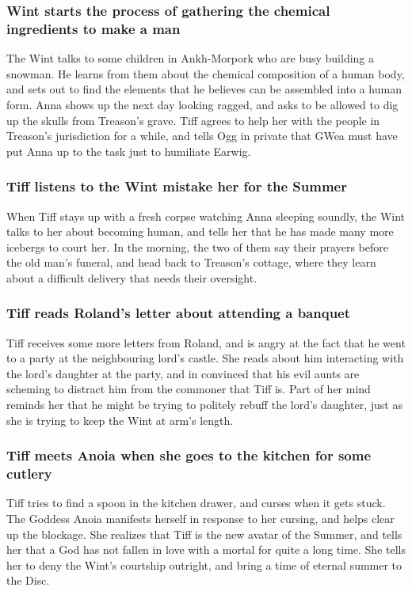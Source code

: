 \subsubsection{\Gls{Wint} starts the process of gathering the chemical ingredients to make a man}
The \Gls{Wint} talks to some children in Ankh-Morpork who are busy building a snowman. He learns
from them about the chemical composition of a human body, and sets out to find the elements that he
believes can be assembled into a human form. \Gls{Anna} shows up the next day looking ragged, and
asks to be allowed to dig up the skulls from \Gls{Treason}'s grave. \Gls{Tiff} agrees to help her
with the people in \Gls{Treason}'s jurisdiction for a while, and tells \Gls{Ogg} in private that
\Gls{GWea} must have put \Gls{Anna} up to the task just to humiliate \Gls{Earwig}.

\subsubsection{\Gls{Tiff} listens to the \Gls{Wint} mistake her for the \Gls{Summer}}
When \Gls{Tiff} stays up with a fresh corpse watching \Gls{Anna} sleeping soundly, the \Gls{Wint}
talks to her about becoming human, and tells her that he has made many more icebergs to court her.
In the morning, the two of them say their prayers before the old man's funeral, and head back to
\Gls{Treason}'s cottage, where they learn about a difficult delivery that needs their oversight.

\subsubsection{\Gls{Tiff} reads \Gls{Roland}'s letter about attending a banquet}
\Gls{Tiff} receives some more letters from \Gls{Roland}, and is angry at the fact that he went to
a party at the neighbouring lord's castle. She reads about him interacting with the lord's daughter
at the party, and in convinced that his evil aunts are scheming to distract him from the commoner
that \Gls{Tiff} is. Part of her mind reminds her that he might be trying to politely rebuff the
lord's daughter, just as she is trying to keep the \Gls{Wint} at arm's length.

\subsubsection{\Gls{Tiff} meets \Gls{Anoia} when she goes to the kitchen for some cutlery}
\Gls{Tiff} tries to find a spoon in the kitchen drawer, and curses when it gets stuck. The Goddess
\Gls{Anoia} manifests herself in response to her cursing, and helps clear up the blockage. She
realizes that \Gls{Tiff} is the new avatar of the \Gls{Summer}, and tells her that a God has not
fallen in love with a mortal for quite a long time. She tells her to deny the \Gls{Wint}'s courtship
outright, and bring a time of eternal summer to the Disc.


